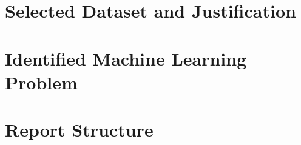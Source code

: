     \section{Selected Dataset and Justification}
    \section{Identified Machine Learning Problem}
    \section{Report Structure}
